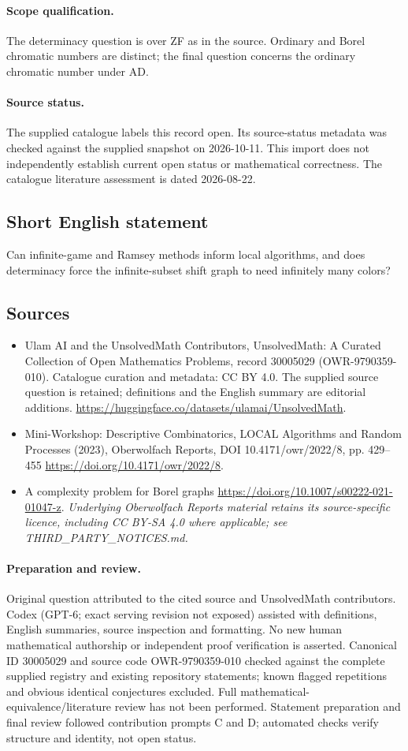 \documentclass[11pt]{article}
\begin{document}
\paragraph{Scope qualification.}
The determinacy question is over ZF as in the source. Ordinary and Borel chromatic numbers are distinct; the final question concerns the ordinary chromatic number under AD.
\paragraph{Source status.}
The supplied catalogue labels this record open. Its source-status metadata was checked against the supplied snapshot on 2026-10-11. This import does not independently establish current open status or mathematical correctness. The catalogue literature assessment is dated 2026-08-22.
\subsection{Short English statement}
Can infinite-game and Ramsey methods inform local algorithms, and does determinacy force the infinite-subset shift graph to need infinitely many colors?
\subsection{Sources}
\begin{itemize}
\item[S1] Ulam AI and the UnsolvedMath Contributors, UnsolvedMath: A Curated Collection of Open Mathematics Problems, record 30005029 (OWR-9790359-010). Catalogue curation and metadata: CC BY 4.0. The supplied source question is retained; definitions and the English summary are editorial additions.
\url{https://huggingface.co/datasets/ulamai/UnsolvedMath}.
\item[S2] Mini-Workshop: Descriptive Combinatorics, LOCAL Algorithms and Random Processes (2023), Oberwolfach Reports, DOI 10.4171/owr/2022/8, pp. 429--455
\url{https://doi.org/10.4171/owr/2022/8}.
\item[S3] A complexity problem for Borel graphs
\url{https://doi.org/10.1007/s00222-021-01047-z}.
\textit{Underlying Oberwolfach Reports material retains its source-specific licence, including CC BY-SA 4.0 where applicable; see THIRD\_PARTY\_NOTICES.md.}
\end{itemize}
\paragraph{Preparation and review.}
Original question attributed to the cited source and UnsolvedMath contributors. Codex (GPT-6; exact serving revision not exposed) assisted with definitions, English summaries, source inspection and formatting. No new human mathematical authorship or independent proof verification is asserted. Canonical ID 30005029 and source code OWR-9790359-010 checked against the complete supplied registry and existing repository statements; known flagged repetitions and obvious identical conjectures excluded. Full mathematical-equivalence/literature review has not been performed. Statement preparation and final review followed contribution prompts C and D; automated checks verify structure and identity, not open status.
\label{end:30005029}
\end{document}
